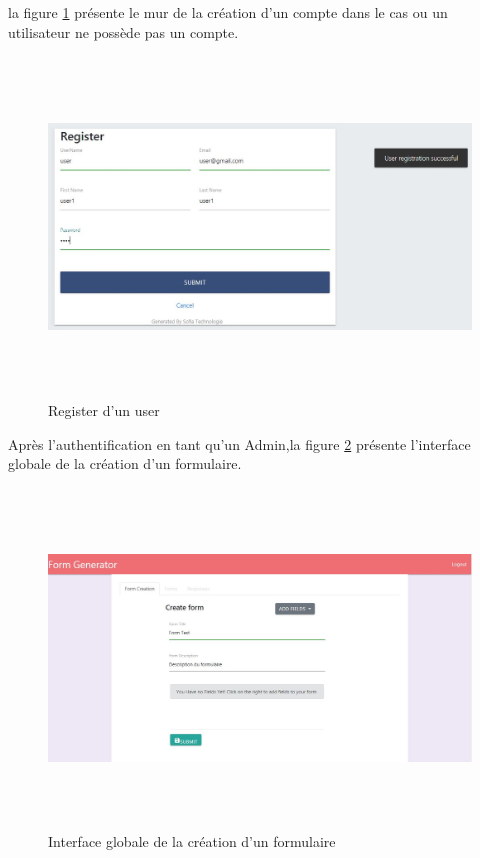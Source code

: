 la figure \ref{register} présente le mur de la création d'un compte dans le cas ou un utilisateur ne possède pas un compte.
\begin{figure} [H]
    \centering
         \begin{center}
             \includegraphics [width=16cm,height=9cm] {SprintImage/register.JPG}
            \caption{Register d'un user}
            \label{register}
        \end{center}
    \end{figure}
Après l'authentification en tant qu'un Admin,la figure \ref{form1} présente l’interface globale de la création d'un formulaire. 
\begin{figure} [H]
    \centering
         \begin{center}
             \includegraphics [width=16cm,height=9cm] {SprintImage/Form1.JPG}
            \caption{Interface globale de la création d'un formulaire}
            \label{form1}
        \end{center}
    \end{figure}


